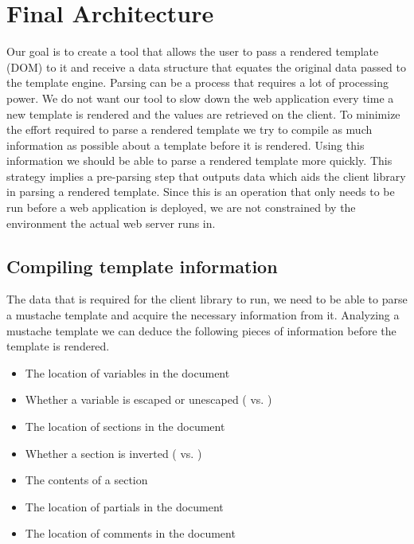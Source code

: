 \chapter{Final Architecture}
\label{chap:arch}

Our goal is to create a tool that allows the user to pass a rendered template
(DOM) to it and receive a data structure that equates
the original data passed to the template engine.
Parsing can be a process that requires a lot of processing power. We do not want
our tool to slow down the web application every time a new template is rendered
and the values are retrieved on the client. To minimize the effort required to
parse a rendered template we try to compile as much information as possible
about a template before it is rendered. Using this information we should be able
to parse a rendered template more quickly.
This strategy implies a pre-parsing step that outputs data which aids
the client library in parsing a rendered template. Since this is an operation
that only needs to be run before a web application is deployed, we are not
constrained by the environment the actual web server runs in.

\section{Compiling template information}
The data that is required for the client library to run, we need
to be able to parse a mustache template and acquire the necessary information
from it.
Analyzing a mustache template we can deduce the following pieces of information
before the template is rendered.

\begin{itemize}
\item The location of variables in the document
\item Whether a variable is escaped or unescaped
      ( vs. )
\item The location of sections in the document
\item Whether a section is inverted
      ( vs. )
\item The contents of a section
\item The location of partials in the document
\item The location of comments in the document
\end{itemize}

